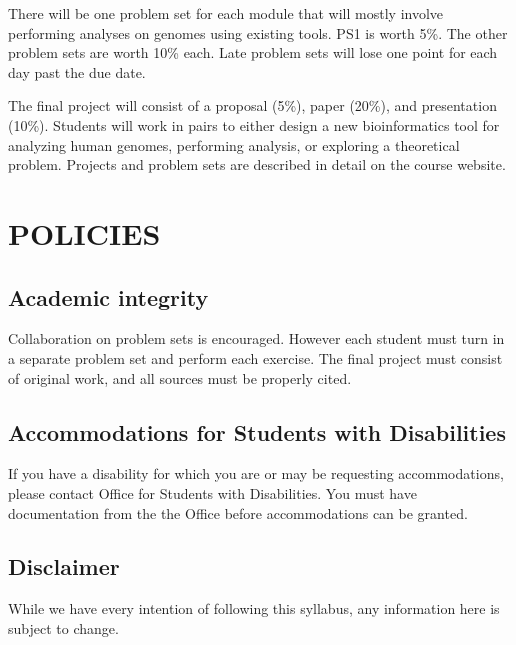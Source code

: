 \documentclass[12pt]{article}
\begin{document}
There will be one problem set for each module that will mostly involve performing analyses on genomes using existing tools. PS1 is worth 5\%. The other problem sets are worth 10\% each. Late problem sets will lose one point for each day past the due date.

The final project will consist of a proposal (5\%), paper (20\%), and presentation (10\%). Students will work in pairs to either design a new bioinformatics tool for analyzing human genomes, performing analysis, or exploring a theoretical problem. Projects and problem sets are described in detail on the course website.

\section*{POLICIES}
\subsection*{Academic integrity}
Collaboration on problem sets is encouraged. However each student must turn in a separate problem set and perform each exercise. The final project must consist of original work, and all sources must be properly cited.

\subsection*{Accommodations for Students with Disabilities}
If you have a disability for which you are or may be requesting accommodations, please contact Office for Students with Disabilities.  You must have documentation from the the Office before accommodations can be granted.
\subsection*{Disclaimer}
While we have every intention of following this syllabus, any information here is subject to change. 
\end{document}
